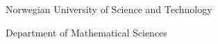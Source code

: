 \begin{titlepage}
    \vfill  %
    
    \begin{center}
        {\color{ntnu-blue}\sffamily\Large Norwegian University of Science and Technology}
        \vspace{0.3cm}  %
        
        {\sffamily\large Department of Mathematical Sciences}
    \end{center}
    
    \vspace{0.8cm}  %
\end{titlepage}
